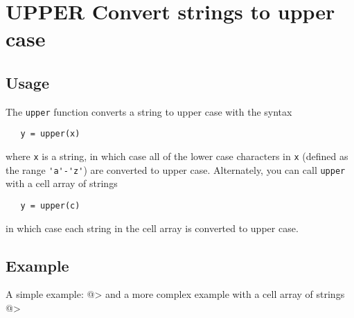 \section{UPPER Convert strings to upper case}

\subsection{Usage}

The \verb|upper| function converts a string to upper case with
the syntax
\begin{verbatim}
   y = upper(x)
\end{verbatim}
where \verb|x| is a string, in which case all of the lower case
characters in \verb|x| (defined as the range \verb|'a'-'z'|) are
converted to upper case.  Alternately, you can call \verb|upper|
with a cell array of strings
\begin{verbatim}
   y = upper(c)
\end{verbatim}
in which case each string in the cell array is converted to upper case.
\subsection{Example}

A simple example:
@>
and a more complex example with a cell array of strings
@>
